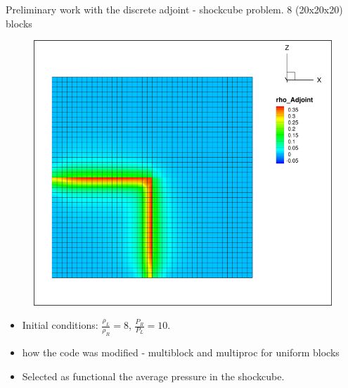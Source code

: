 \documentclass{beamer}
\begin{document}
\begin{frame}
\begin{minipage}[t][1\textheight]{1\textwidth}
\begin{exampleblock}{Preliminary work with the discrete adjoint - shockcube problem. 8 (20x20x20) blocks}
\begin{figure}
{\includegraphics[width=0.65\textheight, trim=0cm 0cm 0 0cm,clip=true]{./figs/rhoAdj_mesh.png}}
\end{figure}
\vspace{-10pt}
\begin{itemize}
\scriptsize
\item Initial conditions: $\frac{\rho_L}{\rho_R} = 8$, $\frac{P_R}{P_L} = 10$. 
\item how the code was modified - multiblock and multiproc for uniform blocks
\item Selected as functional the average pressure in the shockcube.

\end{itemize}

\end{exampleblock}
\end{minipage}

\end{frame}






\setcounter{framenumber}{\value{finalframe}}
\end{document}
